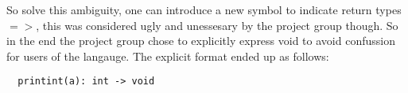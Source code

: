 
So solve this ambiguity, one can introduce a new symbol to indicate return types $=>$, this was considered ugly and unessesary by the project group though. So in the end the project group chose to explicitly express void to avoid confussion for users of the langauge. The explicit format ended up as follows:
\begin{verbatim}
  printint(a): int -> void
\end{verbatim}
